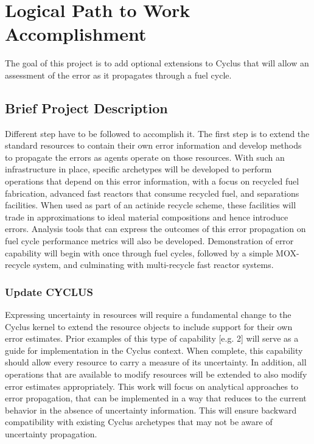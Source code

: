 \documentclass[dvips,12pt]{article}
\begin{document}
\section{Logical Path to Work Accomplishment}
The goal of this project is to add optional extensions to Cyclus that will allow an assessment of the error as it propagates  through a fuel cycle.  
\subsection{Brief Project Description}
Different step have to be followed to accomplish it.
The first step is to extend the standard resources to contain their own error information and develop methods to propagate the errors as agents operate on those resources. With such an infrastructure in place, specific archetypes will be developed to perform operations that depend on this error information, with a focus on recycled fuel fabrication, advanced fast reactors that consume recycled fuel, and separations facilities. 
When used as part of an actinide recycle scheme, these facilities will trade in approximations to ideal material compositions and hence introduce errors. 
Analysis tools that can express the outcomes of this error propagation on fuel cycle performance metrics will also be developed. Demonstration of error capability will begin with once through fuel cycles, followed by a simple MOX-recycle system, and culminating with multi-recycle fast reactor systems.

\subsubsection{Update CYCLUS}%
Expressing uncertainty in resources will require a fundamental change to the Cyclus kernel to extend the resource objects to include support for their own error estimates.  Prior examples of this type of capability [e.g. 2] will serve as a guide for implementation in the Cyclus context.  When complete, this capability should allow every resource to carry a measure of its uncertainty.  In addition, all operations that are available to modify resources will be extended to also modify error estimates appropriately. This work will focus on analytical approaches to error propagation,  that can be implemented in a way that reduces to the current behavior in the absence of uncertainty information. This will ensure backward compatibility with existing Cyclus archetypes that may not be aware of uncertainty propagation.
\end{document}

